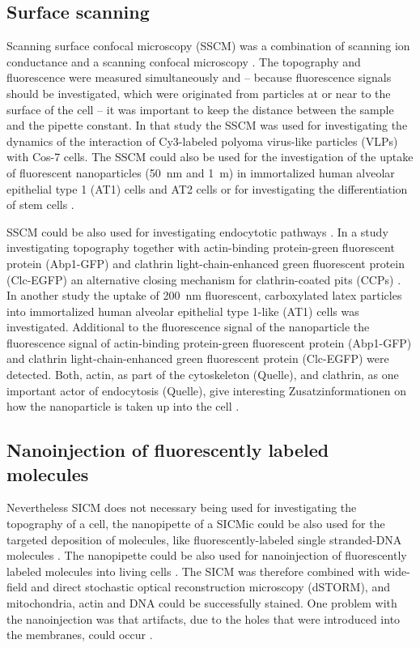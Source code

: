 \subsection{Surface scanning}

Scanning surface confocal microscopy (SSCM) was a combination of scanning ion conductance and a 
scanning confocal microscopy \cite{Gorelik2002}. The topography and fluorescence were measured
simultaneously and -- because fluorescence signals should be investigated, which were originated
from particles at or near to the surface of the cell -- it was important to keep the distance 
between the sample and the pipette constant. In that study the SSCM was used for investigating the 
dynamics of the interaction of Cy3-labeled polyoma virus-like particles (VLPs) with Cos-7 cells. 
The SSCM could also be used for the investigation of the uptake of fluorescent nanoparticles 
(50~nm and 1~{\textmu}m) in immortalized human alveolar epithelial type 1 (AT1) cells and AT2 
cells \cite{Kemp2008} or for investigating the differentiation of stem cells \cite{Gorelik2008}.

SSCM could be also used for investigating endocytotic pathways \cite{Shevchuk2008}. In a study 
investigating topography together with actin-binding protein-green fluorescent protein (Abp1-GFP)
and clathrin light-chain-enhanced green fluorescent protein (Clc-EGFP) an alternative closing 
mechanism for clathrin-coated pits (CCPs) \cite{Shevchuk2012}. In another study the uptake of
200~nm fluorescent, carboxylated latex particles into immortalized human alveolar epithelial type
1-like (AT1) cells was investigated. Additional to the fluorescence signal of the nanoparticle the 
fluorescence signal of actin-binding protein-green fluorescent protein (Abp1-GFP) and clathrin
light-chain-enhanced green fluorescent protein (Clc-EGFP) were detected. Both, actin, as part of
the cytoskeleton (Quelle), and clathrin, as one important actor of endocytosis (Quelle), give 
interesting Zusatzinformationen on how the nanoparticle is taken up into the cell 
\cite{Novak2014}. 

\subsection{Nanoinjection of fluorescently labeled molecules}

Nevertheless SICM does not necessary being used for investigating the topography of a cell, 
the nanopipette of a SICMic could be also used for the targeted deposition of molecules, like 
fluorescently-labeled single stranded-DNA molecules \cite{Ying2002,Hennig2015}. The nanopipette 
could be also used for nanoinjection of fluorescently labeled molecules into living cells 
\cite{Hennig2015a}. The SICM was therefore combined with wide-field and direct stochastic 
optical reconstruction microscopy (dSTORM), and mitochondria, actin and DNA could be successfully 
stained. One problem with the nanoinjection was that artifacts, due to the holes that were 
introduced into the membranes, could occur \cite{Hennig2015a}.

